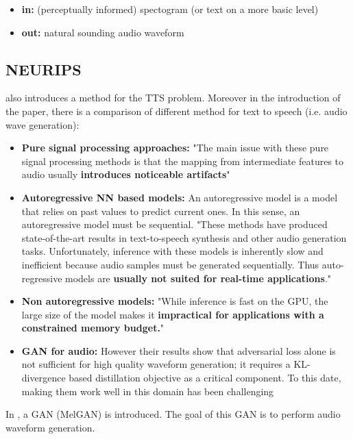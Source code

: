\documentclass{article}
\begin{document}
\begin{itemize}
    \item \textbf{in:} (perceptually informed) spectogram (or text on a more basic level)
    \item \textbf{out:} natural sounding audio waveform
\end{itemize}

\subsection{NEURIPS}

\cite{NEURIPS2019_6804c9bc} also introduces a method for the TTS problem. Moreover in the introduction of the paper, there is a comparison of different method for text to speech (i.e. audio wave generation):

\begin{itemize}
    \item \textbf{Pure signal processing approaches:} "The main issue with these pure signal processing methods is that the mapping from intermediate features to audio usually \textbf{introduces noticeable artifacts}"
    \item \textbf{Autoregressive NN based models:} An autoregressive model is a model that relies on past values to predict current ones. In this sense, an autoregressive model must be sequential. "These methods have produced state-of-the-art results in text-to-speech synthesis and other audio generation tasks. Unfortunately, inference with these models is inherently slow and inefficient because audio samples must be generated sequentially. Thus auto-regressive models are \textbf{usually not suited for real-time applications}."

    \item \textbf{Non autoregressive models:} "While inference is fast on the GPU, the large size of the model makes it \textbf{ impractical for applications with a constrained memory budget.}"
    \item \textbf{GAN for audio:} However their results show that adversarial loss alone is not sufficient for high quality waveform generation; it requires a  KL-divergence based distillation objective as a critical component. To this date, making them work well in this domain has been challenging
\end{itemize}

In \cite{NEURIPS2019_6804c9bc}, a GAN (MelGAN) is introduced. The goal of this GAN is to perform audio waveform generation.
\end{document}
